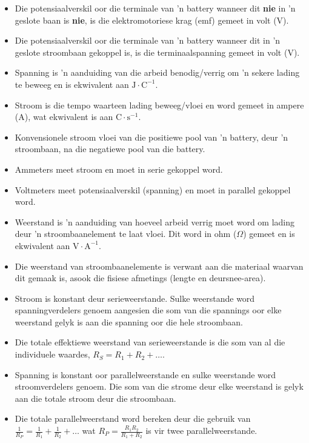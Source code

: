 \label{m38781*id201947}\begin{itemize}[noitemsep ] 
\item Die potensiaalverskil oor die terminale van  'n battery wanneer dit
\textbf{nie} in  'n geslote baan is \textbf{nie}, is die elektromotoriese krag
(emf) gemeet in volt (V).
\item Die potensiaalverskil oor die terminale van  'n battery wanneer dit in
 'n geslote stroombaan gekoppel is, is die terminaalspanning gemeet in volt (V).
\item Spanning is  'n aanduiding van die arbeid benodig/verrig om  'n sekere
lading te beweeg en is ekwivalent aan $\text{J}\cdot\text{C}^{-1}$.
\item Stroom is die tempo waarteen lading beweeg/vloei en word gemeet in ampere
(A), wat ekwivalent is aan $\text{C}\cdot\text{s}^{-1}$.
\item Konvensionele stroom vloei van die positiewe pool van  'n battery,
deur  'n stroombaan, na die negatiewe pool van die battery.
\item Ammeters meet stroom en moet in serie gekoppel word.
\item Voltmeters meet potensiaalverskil (spanning) en moet in parallel
gekoppel word.
\item Weerstand is  'n aanduiding van hoeveel arbeid verrig moet word om lading
deur  'n stroombaanelement te laat vloei. Dit word in ohm ($\Omega$) gemeet en
is ekwivalent aan  $\text{V}\cdot\text{A}^{-1}$.
\item Die weerstand van stroombaanelemente is verwant aan die materiaal waarvan
dit gemaak is, asook die fisiese afmetings (lengte en deursnee-area).
\item Stroom is konstant deur serieweerstande. Sulke weerstande word
spanningverdelers genoem aangesien die som van die spannings oor elke weerstand
gelyk is aan die spanning oor die hele stroombaan.
\item Die totale effektiewe weerstand van serieweerstande is die som van al die
individuele waardes, $R_S=R_1+R_2+\ldots$.
\item Spanning is konstant oor parallelweerstande en sulke weerstande
word stroomverdelers genoem. Die som van die strome deur elke weerstand is
gelyk aan die totale stroom deur die stroombaan.
\item Die totale parallelweerstand word bereken deur die gebruik van 
$\frac{1}{R_P}=\frac{1}{R_1}+\frac{1}{R_2}+\ldots$ wat
$R_P=\frac{R_1R_2}{R_1+R_2}$ is vir twee parallelweerstande.
\end{itemize}

